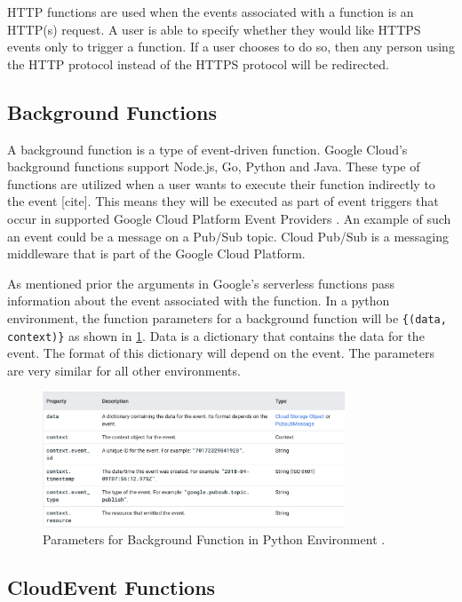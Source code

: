 \documentclass[10pt, conference]{IEEEtran}
\begin{document}
HTTP functions are used when the events associated with a function is an HTTP(s) request. A user is able to specify whether they would like HTTPS events only to trigger a function. If a user chooses to do so, then any person using the HTTP protocol instead of the HTTPS protocol will be redirected. 

\subsection{Background Functions}

A background function is a type of event-driven function. Google Cloud's background functions support Node.js, Go, Python and Java. These type of functions are utilized when a user wants to execute their function indirectly to the event [cite]. This means they will be executed as part of event triggers that occur in supported Google Cloud Platform Event Providers \cite{b7}. An example of such an event could be a message on a Pub/Sub topic. Cloud Pub/Sub is a messaging middleware that is part of the Google Cloud Platform. 

As mentioned prior the arguments in Google's serverless functions pass information about the event associated with the function. In a python environment, the function parameters for a background function will be \verb|{(data, context)}| as shown in \ref{fig:param}. Data is a dictionary that contains the data for the event. The format of this dictionary will depend on the event. The parameters are very similar for all other environments. 

\begin{figure}[htbp]
\centerline{\includegraphics[width=9cm]{background_parameters.PNG}}
\caption{Parameters for Background Function in Python Environment \cite{b6}.}
\label{fig:param}
\end{figure}

\subsection{CloudEvent Functions}
\end{document}
